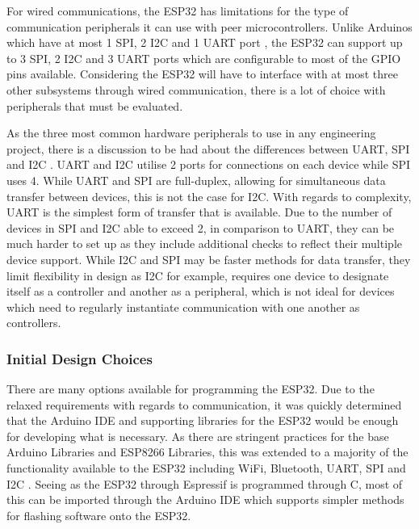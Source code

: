 \documentclass[a4paper]{article}
\begin{document}
For wired communications, the ESP32 has limitations for the type of 
communication peripherals it can use with peer microcontrollers. 
Unlike Arduinos which have at most 1 SPI, 2 I2C and 1 UART port 
\cite{ArduinoPeripheral}, the ESP32 can support up to 3 SPI, 2 I2C and 
3 UART ports \cite{ESP32Datasheet} which are configurable to most of 
the GPIO pins available. Considering the ESP32 will have to interface with 
at most three other subsystems through wired communication, 
there is a lot of choice with peripherals that must be evaluated.

As the three most common hardware peripherals to use in any engineering
project, there is a discussion to be had about the differences between
UART, SPI and I2C \cite{CommProtocolComp}. UART and I2C utilise 2 ports 
for connections on each device while SPI uses 4. While UART and SPI 
are full-duplex, allowing for simultaneous data transfer between devices, 
this is not the case for I2C. With regards to complexity, UART is the 
simplest form of transfer that is available. Due to the number of 
devices in SPI and I2C able to exceed 2, in comparison to UART, they 
can be much harder to set up as they include additional checks to reflect
their multiple device support. While I2C and SPI may be faster methods for 
data transfer, they limit flexibility in design as I2C for example, 
requires one device to designate itself as a controller and another as a 
peripheral, which is not ideal for devices which need to regularly 
instantiate communication with one another as controllers.

\subsubsection{Initial Design Choices} 

There are many options available for programming the ESP32. Due to the 
relaxed requirements with regards to communication, it was quickly determined 
that the Arduino IDE and supporting libraries for the ESP32 would be 
enough for developing what is necessary. As there are stringent practices 
for the base Arduino Libraries and ESP8266 Libraries, this was extended 
to a majority of the functionality available to the ESP32 including WiFi, 
Bluetooth, UART, SPI and I2C \cite{ESP32ArduinoGithub}. Seeing as the ESP32 
through Espressif is programmed through C, most of this can be imported 
through the Arduino IDE which supports simpler methods for flashing 
software onto the ESP32.
\end{document}
